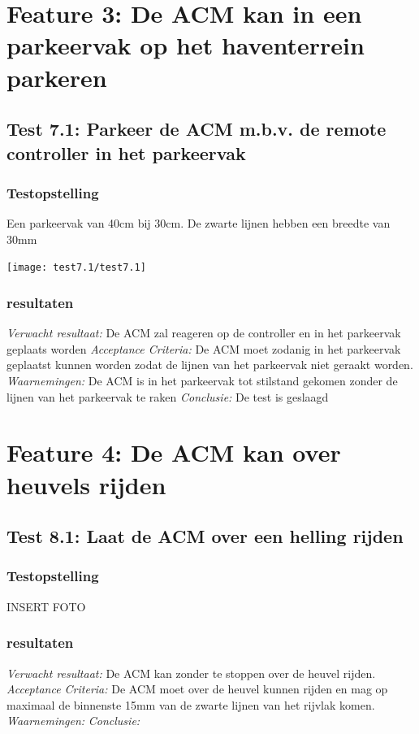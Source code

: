 \documentclass{article}
\begin{document}
\section{Feature 3: De ACM kan in een parkeervak op het haventerrein parkeren}
\subsection{Test 7.1: Parkeer de ACM m.b.v. de remote controller in het parkeervak}
\subsubsection{Testopstelling}
Een parkeervak van 40cm bij 30cm. De zwarte lijnen hebben een breedte van 30mm\\
\begin{center}
  \texttt{[image: test7.1/test7.1]}
\end{center}
\subsubsection{resultaten}
\textit{Verwacht resultaat: }De ACM zal reageren op de controller en in het parkeervak geplaats worden
\newline
\textit{Acceptance Criteria: }De ACM moet zodanig in het parkeervak geplaatst kunnen worden zodat de lijnen van het parkeervak niet geraakt worden.
\newline
\textit{Waarnemingen: }De ACM is in het parkeervak tot stilstand gekomen zonder de lijnen van het parkeervak te raken
\newline
\textit{Conclusie: }De test is geslaagd

\section{Feature 4: De ACM kan over heuvels rijden}

\subsection{Test 8.1: Laat de ACM over een helling rijden}
\subsubsection{Testopstelling}

INSERT FOTO
\subsubsection{resultaten}
\textit{Verwacht resultaat: }De ACM kan zonder te stoppen over de heuvel rijden.
\newline
\textit{Acceptance Criteria: }De ACM moet over de heuvel kunnen rijden en mag op maximaal de binnenste 15mm van de zwarte lijnen van het rijvlak komen.
\newline
\textit{Waarnemingen: }
\newline
\textit{Conclusie: }
\end{document}
